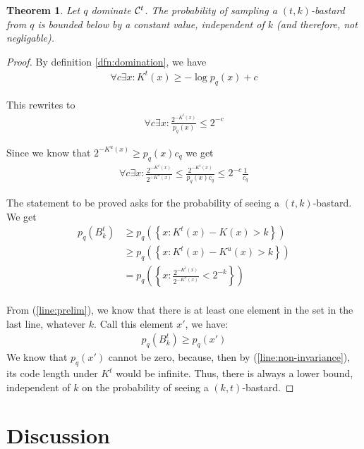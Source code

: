 \documentclass[10pt,a4paper,oneside]{article}
\newtheorem{thm}{Theorem}
\begin{document}
\begin{thm}
Let $q$ dominate ${\cal C}^t$. The probability of sampling a $(t, k)$-bastard from $q$ is bounded below by a constant value, independent of $k$ (and therefore, not negligable).
\end{thm}

\begin{proof}
By definition \ref{dfn:domination}, we have 
\begin{align}
\forall {c \exists x : K^t(x) \geq - \log p_q(x) + c} \label{line:non-invariance}
\end{align}

This rewrites to
\begin{align*}
\forall c \exists x : \frac{2^{-K^t(x)}}{p_q(x)} \leq 2^{-c}
\end{align*}

Since we know that $2^{-K^u(x)} \geq p_q(x) c_q$ we get
\begin{align}
\forall c \exists x : \frac{2^{-K^t(x)}}{2^{-K^u(x)}} \leq \frac{2^{-K^t(x)}}{p_q(x)c_q} \leq 2^{-c}\frac{1}{c_q}
\label{line:prelim}
\end{align}

The statement to be proved asks for the probability of seeing a $(t, k)$-bastard. We get
\begin{align*}
p_q\left(B^t_k\right) &\geq p_q\left (\left\{x: K^t(x) - K(x) > k\right\}\right) \\
	&\geq p_q\left(\left\{x: K^t(x) - K^u(x) > k\right\}\right) \\
	&= p_q\left(\left\{x : \frac{2^{-K^t(x)}}{2^{-K^u(x)}} < 2^{-k}\right\}\right) \\
\end{align*}

From (\ref{line:prelim}), we know that there is at least one element in the set in the last line, whatever $k$. Call this element $x'$, we have:
\begin{align*}
p_q\left(B^t_k\right) \geq p_q\left(x'\right)
\end{align*}
We know that $p_q\left(x'\right)$ cannot be zero, because, then by (\ref{line:non-invariance}), its code length under $K^t$ would be infinite. Thus, there is always a lower bound, independent of $k$ on the probability of seeing a $(k, t)$-bastard.
\end{proof}

\section*{Discussion}

\nocite{*}


\end{document}
